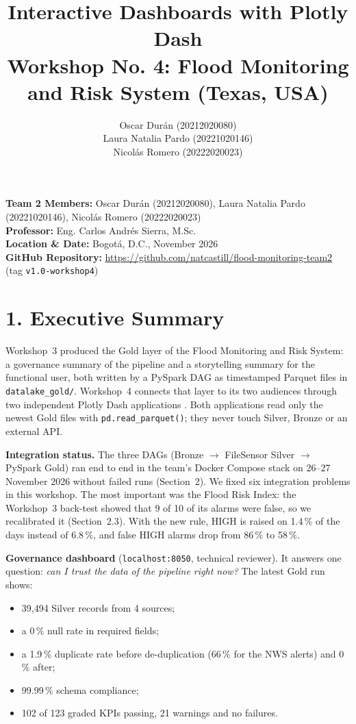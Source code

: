 \documentclass[stu, 12pt, letterpaper, donotrepeattitle, floatsintext, natbib]{apa7}
\title{\Large Interactive Dashboards with Plotly Dash \\ \large Workshop No. 4: Flood Monitoring and Risk System (Texas, USA)}
\author{Oscar Durán (20212020080) \\ Laura Natalia Pardo (20221020146) \\ Nicolás Romero (20222020023)}
\affiliation{Universidad Distrital Francisco José de Caldas}
\begin{document}
\let\oldunderscore\_
\renewcommand{\_}{\oldunderscore\allowbreak}
\maketitle

\renewcommand\contentsname{\large Contents}
\tableofcontents
\setcounter{tocdepth}{2}
\newpage


\noindent \textbf{Team 2 Members:} Oscar Durán (20212020080), Laura Natalia Pardo (20221020146), Nicolás Romero (20222020023) \\
\textbf{Professor:} Eng. Carlos Andrés Sierra, M.Sc. \\
\textbf{Location \& Date:} Bogotá, D.C., November 2026 \\
\textbf{GitHub Repository:} \url{https://github.com/natcastill/flood-monitoring-team2} (tag \texttt{v1.0-workshop4})

\section{\large 1. Executive Summary}
Workshop~3 produced the Gold layer of the Flood Monitoring and Risk System: a governance summary of the pipeline and a storytelling summary for the functional user, both written by a PySpark DAG as timestamped Parquet files in \texttt{datalake\_gold/}. Workshop~4 connects that layer to its two audiences through two independent Plotly Dash applications \citep{plotly2024}. Both applications read only the newest Gold files with \texttt{pd.read\_parquet()}; they never touch Silver, Bronze or an external API.

\textbf{Integration status.} The three DAGs (Bronze $\rightarrow$ FileSensor Silver $\rightarrow$ PySpark Gold) ran end to end in the team's Docker Compose stack on 26--27 November 2026 without failed runs (Section~2). We fixed six integration problems in this workshop. The most important was the Flood Risk Index: the Workshop~3 back-test showed that 9 of 10 of its alarms were false, so we recalibrated it (Section~2.3). With the new rule, HIGH is raised on 1.4\,\% of the days instead of 6.8\,\%, and false HIGH alarms drop from 86\,\% to 58\,\%.

\textbf{Governance dashboard} (\texttt{localhost:8050}, technical reviewer). It answers one question: \emph{can I trust the data of the pipeline right now?} The latest Gold run shows:
\begin{itemize}
    \item 39,494 Silver records from 4 sources;
    \item a 0\,\% null rate in required fields;
    \item a 1.9\,\% duplicate rate before de-duplication (66\,\% for the NWS alerts) and 0\,\% after;
    \item 99.99\,\% schema compliance;
    \item 102 of 123 graded KPIs passing, 21 warnings and no failures.
\end{itemize}
\end{document}
